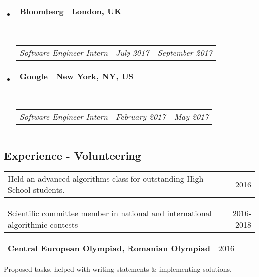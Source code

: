 \documentclass[10pt,letterpaper]{article}
\makeatletter
\newcommand{\headerrow}[2]
{\begin{tabular*}{\linewidth}{l@{\extracolsep{\fill}}r}
	#1 &
	#2 \\
\end{tabular*}}
\makeatother
\begin{document}
\begin{itemize}
	\item
	\headerrow
		{\textbf{Bloomberg}}
		{\textbf{London, UK}}
	\\
	\headerrow
		{\emph{Software Engineer Intern}}
		{\emph{July 2017 - September 2017}}

	\item
	\headerrow
		{\textbf{Google}}
		{\textbf{New York, NY, US}}
	\\
	\headerrow
		{\emph{Software Engineer Intern}}
		{\emph{February 2017 - May 2017}}
\end{itemize}

\hrule
\vspace{-1em}

\subsection*{Experience - Volunteering}

\vspace{-0.4em}

\begin{itemize*}

	\item
    \headerrow
        {Held an advanced algorithms class for outstanding High School students.}
        {2016}

	\item
    \headerrow
        {Scientific committee member in national and
        international algorithmic contests}
        {2016-2018}

    \item
    \headerrow
        {\textbf{Central European Olympiad, Romanian Olympiad}}
        {2016}

\vspace{-0.6em}

	\begin{itemize*}
		\item Proposed tasks, helped with writing statements \& implementing solutions.
	\end{itemize*}

\end{itemize*}
\end{document}
